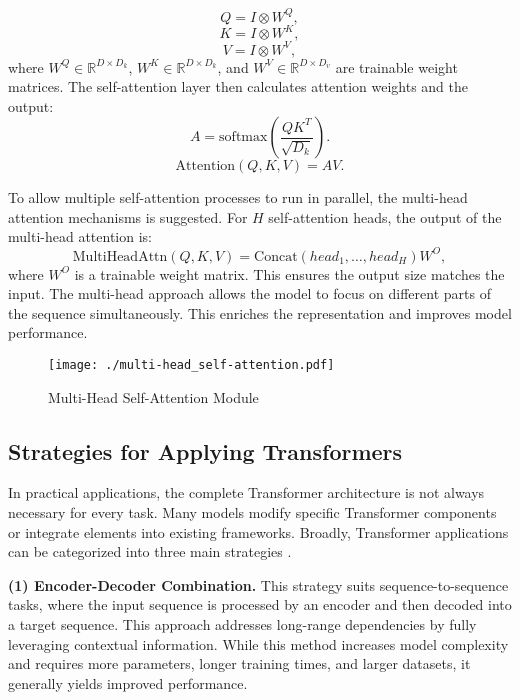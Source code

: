 \documentclass[preprint,12pt]{elsarticle}
\begin{document}
\begin{equation}
Q = I \otimes W^Q,
\end{equation}
\begin{equation}
K = I \otimes W^K,
\end{equation}
\begin{equation}
V = I \otimes W^V,
\end{equation}
where $W^Q \in \mathbb{R}^{{D \times D_k}}$, $W^K \in \mathbb{R}^{{D \times D_k}}$, and $W^V \in \mathbb{R}^{{D \times D_v}}$ are trainable weight matrices. The self-attention layer then calculates attention weights and the output:
\begin{equation}
A = \text{softmax}(\frac{Q K^T}{\sqrt{D_k}}).
\end{equation}
\begin{equation}
\text{Attention}(Q,K,V) = A  V.
\end{equation}

To allow multiple self-attention processes to run in parallel, the multi-head attention mechanisms is suggested. For $H$ self-attention heads, the output of the multi-head attention is:
\begin{equation}
\text{MultiHeadAttn}(Q,K,V) = \text{Concat}(head_1,\ldots,head_H)W^O,
\end{equation}
where $W^O$ is a trainable weight matrix. This ensures the output size matches the input. The multi-head approach allows the model to focus on different parts of the sequence simultaneously. This enriches the representation and improves model performance.

\begin{figure*}[h]
	\centering
	  \texttt{[image: ./multi-head\_self-attention.pdf]}
	\caption{Multi-Head Self-Attention Module}
 \label{fig:multi-head}
\end{figure*}

\subsection{Strategies for Applying Transformers}

In practical applications, the complete Transformer architecture is not always necessary for every task. Many models modify specific Transformer components or integrate elements into existing frameworks. Broadly, Transformer applications can be categorized into three main strategies \cite{lin2022survey}.

\textbf{(1) Encoder-Decoder Combination.} This strategy suits sequence-to-sequence tasks, where the input sequence is processed by an encoder and then decoded into a target sequence. This approach addresses long-range dependencies by fully leveraging contextual information. While this method increases model complexity and requires more parameters, longer training times, and larger datasets, it generally yields improved performance.
\end{document}
